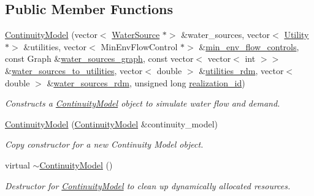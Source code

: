 \subsection*{Public Member Functions}
\begin{DoxyCompactItemize}
\item 
\mbox{\hyperlink{classContinuityModel_acadf595deb924bc08c9b702adf223365}{Continuity\+Model}} (vector$<$ \mbox{\hyperlink{classWaterSource}{Water\+Source}} $\ast$$>$ \&water\+\_\+sources, vector$<$ \mbox{\hyperlink{classUtility}{Utility}} $\ast$$>$ \&utilities, vector$<$ Min\+Env\+Flow\+Control $\ast$$>$ \&\mbox{\hyperlink{classContinuityModel_afc991e5c0d144020e49a97751a04b302}{min\+\_\+env\+\_\+flow\+\_\+controls}}, const Graph \&\mbox{\hyperlink{classContinuityModel_a563401588c6fa622f03393909a3522db}{water\+\_\+sources\+\_\+graph}}, const vector$<$ vector$<$ int $>$$>$ \&\mbox{\hyperlink{classContinuityModel_ae8516bcbbf52650190277fc8b06c1843}{water\+\_\+sources\+\_\+to\+\_\+utilities}}, vector$<$ double $>$ \&\mbox{\hyperlink{classContinuityModel_aa4a00b76da6295d2faa11e3dcaea1896}{utilities\+\_\+rdm}}, vector$<$ double $>$ \&\mbox{\hyperlink{classContinuityModel_ab7b8fa93a6f56b328e425e1ead6cfefa}{water\+\_\+sources\+\_\+rdm}}, unsigned long \mbox{\hyperlink{classContinuityModel_a7b6c99bf256f6c6b633ebb78282f43c7}{realization\+\_\+id}})
\begin{DoxyCompactList}\small\item\em Constructs a \mbox{\hyperlink{classContinuityModel}{Continuity\+Model}} object to simulate water flow and demand. \end{DoxyCompactList}\item 
\mbox{\hyperlink{classContinuityModel_a7f46eb1f937b813226ca7fee96e5fd5c}{Continuity\+Model}} (\mbox{\hyperlink{classContinuityModel}{Continuity\+Model}} \&continuity\+\_\+model)
\begin{DoxyCompactList}\small\item\em Copy constructor for a new Continuity Model object. \end{DoxyCompactList}\item 
virtual \mbox{\hyperlink{classContinuityModel_ae901ce342cd6e49c17994e4910873187}{$\sim$\+Continuity\+Model}} ()
\begin{DoxyCompactList}\small\item\em Destructor for \mbox{\hyperlink{classContinuityModel}{Continuity\+Model}} to clean up dynamically allocated resources. \end{DoxyCompactList}\item 

\end{DoxyCompactItemize}
